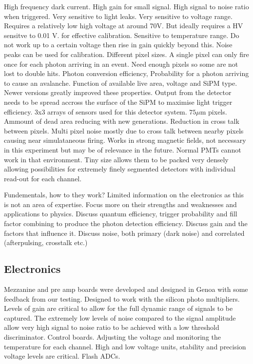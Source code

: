 High frequency dark current.
High gain for small signal.
High signal to noise ratio when triggered.
Very sensitive to light leaks.
Very sensitive to voltage range. Requires a relatively low high voltage at around 70V. But ideally requires a HV sensitve to 0.01 V. for effective calibration.
Sensitive to temperature range.
Do not work up to a certain voltage then rise in gain quickly beyond this.
Noise peaks can be used for calibration.
Different pixel sizes. A single pixel can only fire once for each photon arriving in an event. Need enough pixels so some are not lost to double hits.
Photon conversion efficiency, Probability for a photon arriving to cause an avalanche. Function of available live area, voltage and SiPM type. Newer versions greatly improved these properties.
Output from the detector needs to be spread accross the surface of the SiPM to maximise light trigger efficiency.
3x3 arrays of sensors used for this detector system. $75\mu$m pixels. Ammount of dead area reducing with new generations.
Reduction in cross talk between pixels. Multi pixel noise mostly due to cross talk between nearby pixels causing near simulataneous firing.
Works in strong magnetic fields, not necessary in this experiment but may be of relevance in the future. Normal PMTs cannot work in that environment.
Tiny size allows them to be packed very densely allowing possibilities for extremely finely segmented detectors with individual read-out for each channel.

Fundementals, how to they work? Limited information on the electronics as this is not an area of expertise.
Focus more on their strengths and weaknesses and applications to physics.
Discuss quantum efficiency, trigger probability and fill factor combining to produce the photon detection efficiency.
Discuss gain and the factors that influence it.
Discuss noise, both primary (dark noise) and correlated (afterpulsing, crosstalk etc.)

\cite{barbosa2012silicon}
\cite{degtiarenko2011calculation}
\cite{lightfoot2008characterisation}
\cite{website:AdvanSiDSiPMpdf}

\subsection{Electronics}
Mezzanine and pre amp boards were developed and designed in Genoa with some feedback from our testing. Designed to work with the silicon photo multipliers. Levels of gain are critical to allow for the full dynamic range of signals to be captured. The extremely low levels of noise compared to the signal amplitude allow very high signal to noise ratio to be achieved with a low threshold discriminator.
Control boards. Adjusting the voltage and monitoring the temperature for each channel.
High and low voltage units, stability and precision voltage levels are critical.
Flash ADCs.

